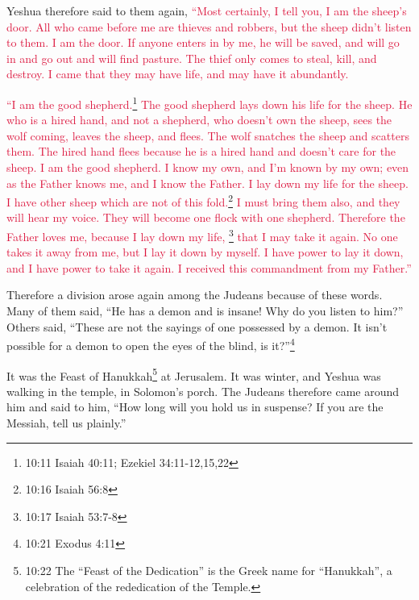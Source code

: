 \myverse{}Yeshua therefore said to them again,
\textcolor{crimson}{“Most certainly, I tell you, I am the sheep’s door.
}
\myverse{}\textcolor{crimson}{All who came before me are thieves and robbers, but the sheep didn’t listen
	to them.
}
\myverse{}\textcolor{crimson}{I am the door. If anyone enters in by me, he will be saved, and will go
	in and go out and will find pasture.
}
\myverse{}\textcolor{crimson}{The thief only comes to steal, kill, and destroy. I came that they may
	have life, and may have it abundantly.
}

\myverse{}\textcolor{crimson}{“I am the good shepherd.}\footnote{10:11 Isaiah 40:11;
	Ezekiel 34:11-12,15,22}
\textcolor{crimson}{The good shepherd lays down his life for the sheep.
}
\myverse{}\textcolor{crimson}{He who is a hired hand, and not a shepherd, who doesn’t own the sheep,
	sees the wolf coming, leaves the sheep, and flees. The wolf snatches the sheep and scatters them.
}
\myverse{}\textcolor{crimson}{The hired hand flees because he is a hired hand and doesn’t care for
	the sheep.
}
\myverse{}\textcolor{crimson}{I am the good shepherd. I know my own, and I’m known by my own;
}
\myverse{}\textcolor{crimson}{even as the Father knows me, and I know the Father. I lay down my life
	for the sheep.
}
\myverse{}\textcolor{crimson}{I have other sheep which are not of this fold.}\footnote{10:16 Isaiah 56:8
}
\textcolor{crimson}{I must bring them also, and they will hear my voice. They will become one flock with one shepherd.
}
\myverse{}\textcolor{crimson}{Therefore the Father loves me, because I lay down my life,
}\footnote{10:17 Isaiah 53:7-8}
\textcolor{crimson}{that I may take it again.
}
\myverse{}\textcolor{crimson}{No one takes it away from me, but I lay it down by myself. I have power
	to lay it down, and I have power to take it again. I received this commandment from my Father.”}

\myverse{}Therefore a division arose again among the Judeans because of
these words.
\myverse{}Many of them said, “He has a demon and is insane! Why do you listen to him?”
\myverse{}Others said, “These are not the sayings of one possessed by a demon. It isn’t
possible for a demon to open the eyes of the blind, is it?”\footnote{10:21 Exodus 4:11}

\myverse{}It was the Feast of Hanukkah\footnote{10:22 The “Feast of the Dedication” is the Greek name for “Hanukkah”, a celebration of the rededication
	of the Temple.} at Jerusalem.
\myverse{}It was winter, and Yeshua was walking in the temple, in Solomon’s porch.
\myverse{}The Judeans therefore came around him and said to him, “How long will you
hold us in suspense? If you are the Messiah, tell us plainly.”

